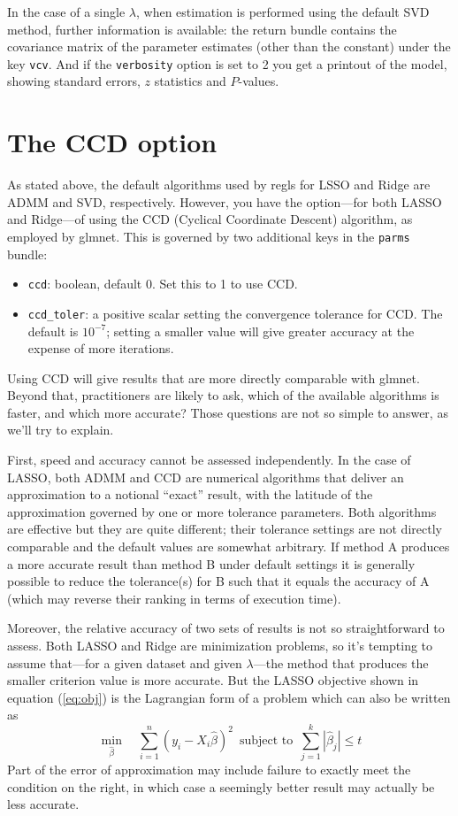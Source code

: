 \documentclass{article}
\begin{document}
In the case of a single $\lambda$, when estimation is performed using
the default SVD method, further information is available: the return
bundle contains the covariance matrix of the parameter estimates
(other than the constant) under the key \texttt{vcv}. And if the
\texttt{verbosity} option is set to 2 you get a printout of the model,
showing standard errors, $z$ statistics and $P$-values.

\section{The CCD option}
\label{sec:ccd}

As stated above, the default algorithms used by \textsf{regls} for
LSSO and Ridge are ADMM and SVD, respectively. However, you have the
option---for both LASSO and Ridge---of using the CCD (Cyclical
Coordinate Descent) algorithm, as employed by \textsf{glmnet}. This is
governed by two additional keys in the \texttt{parms} bundle:
\begin{itemize}
\item \texttt{ccd}: boolean, default 0. Set this to 1 to use CCD.
\item \texttt{ccd\_toler}: a positive scalar setting the convergence
  tolerance for CCD. The default is $10^{-7}$; setting a smaller value
  will give greater accuracy at the expense of more iterations.
\end{itemize}

Using CCD will give results that are more directly comparable with
\textsf{glmnet}. Beyond that, practitioners are likely to ask, which
of the available algorithms is faster, and which more accurate? Those
questions are not so simple to answer, as we'll try to explain.

First, speed and accuracy cannot be assessed independently. In the
case of LASSO, both ADMM and CCD are numerical algorithms that deliver
an approximation to a notional ``exact'' result, with the latitude of
the approximation governed by one or more tolerance parameters. Both
algorithms are effective but they are quite different; their tolerance
settings are not directly comparable and the default values are
somewhat arbitrary. If method A produces a more accurate result than
method B under default settings it is generally possible to reduce the
tolerance(s) for B such that it equals the accuracy of A (which may
reverse their ranking in terms of execution time).

Moreover, the relative accuracy of two sets of results is not so
straightforward to assess. Both LASSO and Ridge are minimization
problems, so it's tempting to assume that---for a given dataset and
given $\lambda$---the method that produces the smaller criterion value
is more accurate. But the LASSO objective shown in equation
(\ref{eq:obj}) is the Lagrangian form of a problem which can also be
written as
\[
  \min_{\hat{\beta}} \quad
  \sum_{i=1}^n (y_i - X_i\hat{\beta})^2 \,\mbox{ subject to }\,
  \sum_{j=1}^k |\hat{\beta}_j| \leq t
\]
Part of the error of approximation may include failure to exactly meet
the condition on the right, in which case a seemingly better result
may actually be less accurate.
\end{document}
